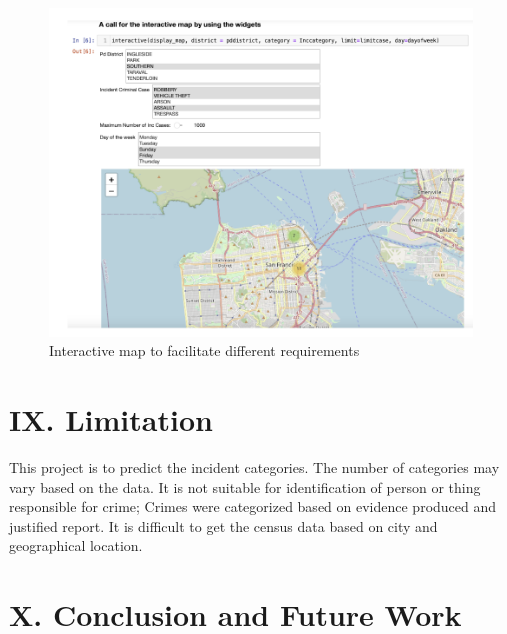 \documentclass[11 pt,conference,final,]{IEEEtran}
\begin{document}
\begin{figure}

{\centering \includegraphics[width=0.95\linewidth]{img/fig14b} 

}

\caption{Interactive map to facilitate different requirements}\label{fig:unnamed-chunk-19}
\end{figure}

\section{IX. Limitation}\label{ix.-limitation}

This project is to predict the incident categories. The number of
categories may vary based on the data. It is not suitable for
identification of person or thing responsible for crime; Crimes were
categorized based on evidence produced and justified report. It is
difficult to get the census data based on city and geographical
location.

\section{X. Conclusion and Future
Work}\label{x.-conclusion-and-future-work}
\end{document}
